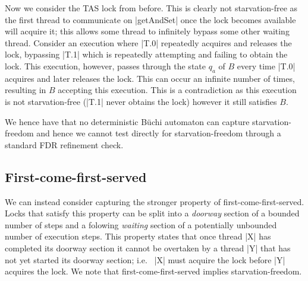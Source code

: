 
Now we consider the TAS lock from before. This is clearly not starvation-free as the first thread to communicate on |getAndSet| once the lock becomes available will acquire it; this allows some thread to infinitely bypass some other waiting thread. Consider an execution where |T.0| repeatedly acquires and releases the lock, bypassing |T.1| which is repeatedly attempting and failing to obtain the lock. This execution, however, passes through the state $q_{a}$ of $B$ every time |T.0| acquires and later releases the lock. This can occur an infinite number of times, resulting in $B$ accepting this execution. This is a contradiction as this execution is not starvation-free (|T.1| never obtains the lock) however it still satisfies $B$.



We hence have that no deterministic B{\"u}chi automaton can capture starvation-freedom and hence we cannot test directly for starvation-freedom through a standard FDR refinement check.

\subsection{First-come-first-served}

We can instead consider capturing the stronger property of first-come-first-served. Locks that satisfy this property can be split into a \emph{doorway} section of a bounded number of steps and a folowing \emph{waiting} section of a potentially unbounded number of execution steps. This property states that once thread |X| has completed its doorway section it cannot be overtaken by a thread |Y| that has not yet started its doorway section; i.e.~ |X| must acquire the lock before |Y| acquires the lock. We note that first-come-first-served implies starvation-freedom.

